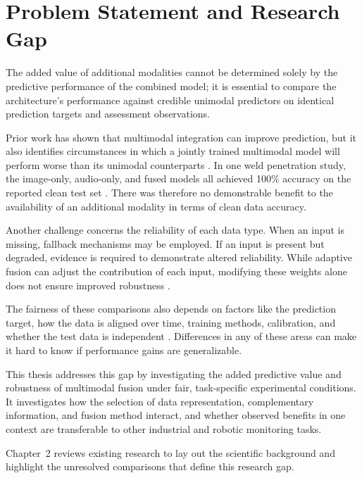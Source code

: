 
\section{Problem Statement and Research Gap}

The added value of additional modalities cannot be determined
solely by the predictive performance of the combined model; it is
essential to compare the architecture's performance against
credible unimodal predictors on identical prediction targets
and assessment observations.

Prior work has shown that multimodal integration can improve
prediction, but it also identifies circumstances in which a jointly
trained multimodal model will perform worse than its unimodal
counterparts \parencite{Wang2020What}. In one weld penetration study,
the image-only, audio-only, and fused models all achieved 100\%
accuracy on the reported clean test set
\parencite[Tables~1--3]{Hua2026Weld}. There was therefore no demonstrable
benefit to the availability of an additional modality in terms
of clean data accuracy.

Another challenge concerns the reliability of each data type.
When an input is missing, fallback mechanisms may be employed.
If an input is present but degraded, evidence is required to
demonstrate altered reliability. While adaptive fusion can adjust
the contribution of each input, modifying these weights alone
does not ensure improved robustness \parencite{Zhang2023QMF,P008}.

The fairness of these comparisons also depends on factors like
the prediction target, how the data is aligned over time, training
methods, calibration, and whether the test data is independent
\parencite{P017,P004,Guo2017Calibration,P008}. Differences in any of
these areas can make it hard to know if performance gains are
generalizable.

This thesis addresses this gap by investigating the added predictive
value and robustness of multimodal fusion under fair, task-specific
experimental conditions. It investigates how the selection of data
representation, complementary information, and fusion method
interact, and whether observed benefits in one context are
transferable to other industrial and robotic monitoring tasks.

Chapter~2 reviews existing research to lay out the scientific
background and highlight the unresolved comparisons that define
this research gap.


